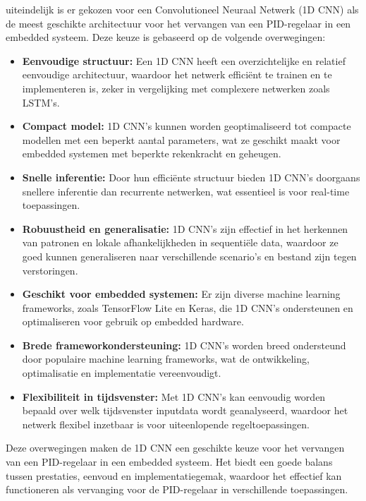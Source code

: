 \begin{itemize}
uiteindelijk is er gekozen voor een Convolutioneel Neuraal Netwerk (1D CNN) als de meest geschikte architectuur voor het vervangen van een PID-regelaar in een embedded systeem. Deze keuze is gebaseerd op de volgende overwegingen:
\begin{itemize}
  \item \textbf{Eenvoudige structuur:} Een 1D CNN heeft een overzichtelijke en relatief eenvoudige architectuur, waardoor het netwerk efficiënt te trainen en te implementeren is, zeker in vergelijking met complexere netwerken zoals LSTM's.
  \item \textbf{Compact model:} 1D CNN's kunnen worden geoptimaliseerd tot compacte modellen met een beperkt aantal parameters, wat ze geschikt maakt voor embedded systemen met beperkte rekenkracht en geheugen.
  \item \textbf{Snelle inferentie:} Door hun efficiënte structuur bieden 1D CNN's doorgaans snellere inferentie dan recurrente netwerken, wat essentieel is voor real-time toepassingen.
  \item \textbf{Robuustheid en generalisatie:} 1D CNN's zijn effectief in het herkennen van patronen en lokale afhankelijkheden in sequentiële data, waardoor ze goed kunnen generaliseren naar verschillende scenario's en bestand zijn tegen verstoringen.
  \item \textbf{Geschikt voor embedded systemen:} Er zijn diverse machine learning frameworks, zoals TensorFlow Lite en Keras, die 1D CNN's ondersteunen en optimaliseren voor gebruik op embedded hardware.
  \item \textbf{Brede frameworkondersteuning:} 1D CNN's worden breed ondersteund door populaire machine learning frameworks, wat de ontwikkeling, optimalisatie en implementatie vereenvoudigt.
  \item \textbf{Flexibiliteit in tijdsvenster:} Met 1D CNN's kan eenvoudig worden bepaald over welk tijdsvenster inputdata wordt geanalyseerd, waardoor het netwerk flexibel inzetbaar is voor uiteenlopende regeltoepassingen.
\end{itemize}
Deze overwegingen maken de 1D CNN een geschikte keuze voor het vervangen van een PID-regelaar in een embedded systeem. Het biedt een goede balans tussen prestaties, eenvoud en implementatiegemak, waardoor het effectief kan functioneren als vervanging voor de PID-regelaar in verschillende toepassingen.









\end{itemize}
